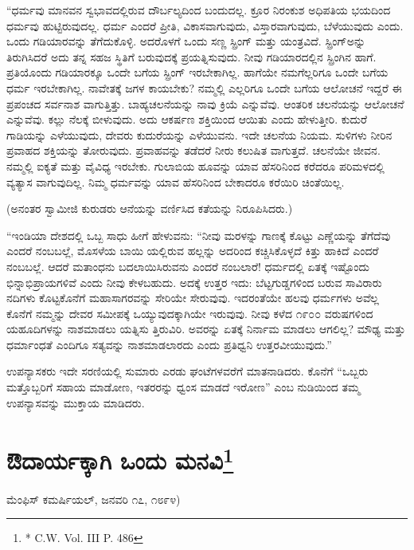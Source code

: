 “ಧರ್ಮವು ಮಾನವನ ಸ್ವಭಾವದಲ್ಲಿರುವ ದೌರ್ಬಲ್ಯದಿಂದ ಬಂದುದಲ್ಲ. ಕ್ರೂರ ನಿರಂಕುಶ ಅಧಿಪತಿಯ ಭಯದಿಂದ ಧರ್ಮವು ಹುಟ್ಟಿರುವುದಲ್ಲ. ಧರ್ಮ ಎಂದರೆ ಪ್ರೀತಿ, ವಿಕಾಸವಾಗುವುದು, ವಿಸ್ತಾರವಾಗುವುದು, ಬೆಳೆಯುವುದು ಎಂದು. ಒಂದು ಗಡಿಯಾರವನ್ನು ತೆಗೆದುಕೊಳ್ಳಿ. ಅದರೊಳಗೆ ಒಂದು ಸಣ್ಣ ಸ್ಪ್ರಿಂಗ್​ ಮತ್ತು ಯಂತ್ರವಿದೆ. ಸ್ಪ್ರಿಂಗ್​ ಅನ್ನು ತಿರುಗಿಸಿದರೆ ಅದು ತನ್ನ ಸಹಜ ಸ್ಥಿತಿಗೆ ಬರುವುದಕ್ಕೆ ಪ್ರಯತ್ನಿಸುವುದು. ನೀವು ಗಡಿಯಾರದಲ್ಲಿನ ಸ್ಪ್ರಿಂಗಿನ ಹಾಗೆ. ಪ್ರತಿಯೊಂದು ಗಡಿಯಾರಕ್ಕೂ ಒಂದೇ ಬಗೆಯ ಸ್ಪ್ರಿಂಗ್​ ಇರಬೇಕಾಗಿಲ್ಲ. ಹಾಗೆಯೇ ನಮಗೆಲ್ಲರಿಗೂ ಒಂದೇ ಬಗೆಯ ಧರ್ಮ ಇರಬೇಕಾಗಿಲ್ಲ. ನಾವೇತಕ್ಕೆ ಜಗಳ ಕಾಯಬೇಕು? ನಮ್ಮಲ್ಲಿ ಎಲ್ಲರಿಗೂ ಒಂದೇ ಬಗೆಯ ಆಲೋಚನೆ ಇದ್ದರೆ ಈ ಪ್ರಪಂಚದ ಸರ್ವನಾಶ ವಾಗುತ್ತಿತ್ತು. ಬಾಹ್ಯಚಲನೆಯನ್ನು ನಾವು ಕ್ರಿಯೆ ಎನ್ನುವೆವು. ಆಂತರಿಕ ಚಲನೆಯನ್ನು ಆಲೋಚನೆ ಎನ್ನುವೆವು. ಕಲ್ಲು ನೆಲಕ್ಕೆ ಬೀಳುವುದು. ಅದು ಆಕರ್ಷಣ ಶಕ್ತಿಯಿಂದ ಆಯಿತು ಎಂದು ಹೇಳುತ್ತೀರಿ. ಕುದುರೆ ಗಾಡಿಯನ್ನು ಎಳೆಯುವುದು, ದೇವರು ಕುದುರೆಯನ್ನು ಎಳೆಯುವನು. ಇದೇ ಚಲನೆಯ ನಿಯಮ. ಸುಳಿಗಳು ನೀರಿನ ಪ್ರವಾಹದ ಶಕ್ತಿಯನ್ನು ತೋರುವುದು. ಪ್ರವಾಹವನ್ನು ತಡೆದರೆ ನೀರು ಕಲುಷಿತ ವಾಗುತ್ತದೆ. ಚಲನೆಯೇ ಜೀವನ. ನಮ್ಮಲ್ಲಿ ಐಕ್ಯತೆ ಮತ್ತು ವೈವಿಧ್ಯ ಇರಬೇಕು. ಗುಲಾಬಿಯ ಹೂವನ್ನು ಯಾವ ಹೆಸರಿನಿಂದ ಕರೆದರೂ ಪರಿಮಳದಲ್ಲಿ ವ್ಯತ್ಯಾಸ ವಾಗುವುದಿಲ್ಲ. ನಿಮ್ಮ ಧರ್ಮವನ್ನು ಯಾವ ಹೆಸರಿನಿಂದ ಬೇಕಾದರೂ ಕರೆಯಿರಿ ಚಿಂತೆಯಿಲ್ಲ.

(ಅನಂತರ ಸ್ವಾಮೀಜಿ ಕುರುಡರು ಆನೆಯನ್ನು ವರ್ಣಿಸಿದ ಕತೆಯನ್ನು ನಿರೂಪಿಸಿದರು.)

“ಇಂಡಿಯಾ ದೇಶದಲ್ಲಿ ಒಬ್ಬ ಸಾಧು ಹೀಗೆ ಹೇಳುವನು: “ನೀವು ಮರಳನ್ನು ಗಾಣಕ್ಕೆ ಕೊಟ್ಟು ಎಣ್ಣೆಯನ್ನು ತೆಗೆದೆವು ಎಂದರೆ ನಂಬಬಲ್ಲೆ, ಮೊಸಳೆಯ ಬಾಯಿ ಯಲ್ಲಿರುವ ಹಲ್ಲನ್ನು ಅದರಿಂದ ಕಚ್ಚಿಸಿಕೊಳ್ಳದೆ ಕಿತ್ತು ಹಾಕಿದೆ ಎಂದರೆ ನಂಬಬಲ್ಲೆ. ಆದರೆ ಮತಾಂಧನು ಬದಲಾಯಿಸಿರುವನು ಎಂದರೆ ನಂಬಲಾರೆ! ಧರ್ಮದಲ್ಲಿ ಏತಕ್ಕೆ ಇಷ್ಟೊಂದು ಭಿನ್ನಾಭಿಪ್ರಾಯಗಳಿವೆ ಎಂದು ನೀವು ಕೇಳಬಹುದು. ಅದಕ್ಕೆ ಉತ್ತರ ಇದು: ಬೆಟ್ಟಗುಡ್ಡಗಳಿಂದ ಬರುವ ಸಾವಿರಾರು ನದಿಗಳು ಕೊಟ್ಟಕೊನೆಗೆ ಮಹಾಸಾಗರವನ್ನು ಸೇರಿಯೇ ಸೇರುವುವು. ಇದರಂತೆಯೇ ಹಲವು ಧರ್ಮಗಳು ಅವೆಲ್ಲ ಕೊನೆಗೆ ನಮ್ಮನ್ನು ದೇವರ ಸಮೀಪಕ್ಕೆ ಒಯ್ಯುವುದಕ್ಕಾಗಿಯೇ ಇರುವುವು. ನೀವು ಕಳೆದ ೧೯೦೦ ವರುಷಗಳಿಂದ ಯಹೂದಿಗಳನ್ನು ನಾಶಮಾಡಲು ಯತ್ನಿಸು ತ್ತಿರುವಿರಿ. ಅವರನ್ನು ಏತಕ್ಕೆ ನಿರ್ನಾಮ ಮಾಡಲು ಆಗಲಿಲ್ಲ? ಮೌಢ್ಯ ಮತ್ತು ಧರ್ಮಾಂಧತೆ ಎಂದಿಗೂ ಸತ್ಯವನ್ನು ನಾಶಮಾಡಲಾರದು ಎಂದು ಪ್ರತಿಧ್ವನಿ ಉತ್ತರವೀಯುವುದು.”

ಉಪನ್ಯಾಸಕರು ಇದೇ ಸರಣಿಯಲ್ಲಿ ಸುಮಾರು ಎರಡು ಘಂಟೆಗಳವರೆಗೆ ಮಾತನಾಡಿದರು. ಕೊನೆಗೆ “ಒಬ್ಬರು ಮತ್ತೊಬ್ಬರಿಗೆ ಸಹಾಯ ಮಾಡೋಣ, ಇತರರನ್ನು ಧ್ವಂಸ ಮಾಡದೆ ಇರೋಣ” ಎಂಬ ನುಡಿಯಿಂದ ತಮ್ಮ ಉಪನ್ಯಾಸವನ್ನು ಮುಕ್ತಾಯ ಮಾಡಿದರು.

\delimiter


\section[ಔದಾರ್ಯಕ್ಕಾಗಿ ಒಂದು ಮನವಿ]{ಔದಾರ್ಯಕ್ಕಾಗಿ ಒಂದು ಮನವಿ\protect\footnote{* C.W. Vol. III P. 486}}

\begin{center}
ಮೆಂಫಿಸ್​ ಕಮರ್ಷಿಯಲ್​, ಜನವರಿ ೧೭, ೧೮೯೪)
\end{center}

